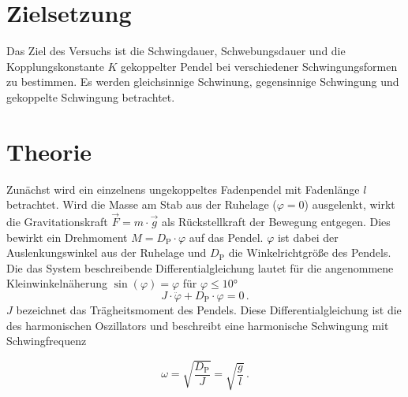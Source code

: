 \section{Zielsetzung}
\label{sec:Zielsetzung}
Das Ziel des Versuchs ist die Schwingdauer, Schwebungsdauer und die Kopplungskonstante $K$ gekoppelter Pendel bei verschiedener Schwingungsformen zu bestimmen. 
Es werden gleichsinnige Schwinung, gegensinnige Schwingung und gekoppelte Schwingung betrachtet.  

\section{Theorie}
\label{sec:Theorie}
Zunächst wird ein einzelnens ungekoppeltes Fadenpendel mit Fadenlänge $l$ betrachtet. 
Wird die Masse am Stab aus der Ruhelage ($\varphi = 0$) ausgelenkt, wirkt 
die Gravitationskraft $\vec{F} = m \cdot \vec{g}$ als Rückstellkraft der Bewegung entgegen. Dies bewirkt ein Drehmoment 
$M = D_{\text{P}} \cdot \varphi$ auf das Pendel. $\varphi$ ist dabei der Auslenkungswinkel aus der Ruhelage und $D_{\text{P}}$ die 
Winkelrichtgröße des Pendels. Die das System beschreibende Differentialgleichung lautet für die angenommene Kleinwinkelnäherung 
$\sin(\varphi) = \varphi$ für $\varphi \leq 10°$
\begin{equation}
    J \cdot \ddot{\varphi} + D_{\text{P}} \cdot \varphi = 0\,.
\end{equation}
$J$ bezeichnet das Trägheitsmoment des Pendels. Diese Differentialgleichung ist die des harmonischen Oszillators und beschreibt eine harmonische Schwingung 
mit Schwingfrequenz 

\begin{equation}
 \omega = \sqrt{\frac{D_{\text{P}}}{J}} = \sqrt{\frac{g}{l}}\, .
\end{equation}
\\
\\

